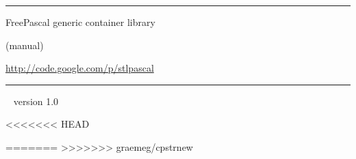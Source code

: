 \documentclass[a4paper]{report}
\begin{document}
\thispagestyle{empty}
\vfill
\vfill
\begin{center}
\begin{minipage}{0.8\textwidth}
\hrule
\bigskip\bigskip
\centerline{\LARGE\sc FreePascal generic container library}
\smallskip
\centerline{(manual)}
\smallskip
\centerline{\url{http://code.google.com/p/stlpascal}}
\bigskip
\bigskip
\bigskip\bigskip
\hrule
\end{minipage}
\end{center}
\vfill
{~}
\hfill version 1.0
\eject %

\tableofcontents










<<<<<<< HEAD


=======
>>>>>>> graemeg/cpstrnew
\end{document}
